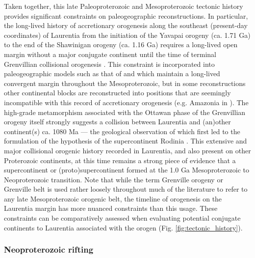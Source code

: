 \documentclass[twocolumn, switch]{article} %
\begin{document}
Taken together, this late Paleoproterozoic and Mesoproterozoic tectonic history provides significant constraints on paleogeographic reconstructions. In particular, the long-lived history of accretionary orogenesis along the southeast (present-day coordinates) of Laurentia from the initiation of the Yavapai orogeny (ca. 1.71 Ga) to the end of the Shawinigan orogeny (ca. 1.16 Ga) requires a long-lived open margin without a major conjugate continent until the time of terminal Grenvillian collisional orogenesis \citep{Karlstrom2001a}. This constraint is incorporated into paleogeographic models such as that of \citet{Zhang2012a} and \citet{Pehrsson2015a} which maintain a long-lived convergent margin throughout the Mesoproterozoic, but in some reconstructions other continental blocks are reconstructed into positions that are seemingly incompatible with this record of accretionary orogenesis (e.g. Amazonia in \citealp{Elming2009a, Elming2021a}). The high-grade metamorphism associated with the Ottawan phase of the Grenvillian orogeny itself strongly suggests a collision between Laurentia and (an)other continent(s) ca. 1080 Ma --- the geological observation of which first led to the formulation of the hypothesis of the supercontinent Rodinia \citep{Hoffman1991a}. This extensive and major collisional orogenic history recorded in Laurentia, and also present on other Proterozoic continents, at this time remains a strong piece of evidence that a supercontinent or (proto)supercontinent formed at the 1.0 Ga Mesoproterozoic to Neoproterozoic transition. Note that while the term Grenville orogeny or Grenville belt is used rather loosely throughout much of the literature to refer to any late Mesoproterozoic orogenic belt, the timeline of orogenesis on the Laurentia margin has more nuanced constraints than this usage. These constraints can be comparatively assessed when evaluating potential conjugate continents to Laurentia associated with the orogen (Fig. \ref{fig:tectonic_history}).

\subsubsection{Neoproterozoic rifting}
\end{document}
